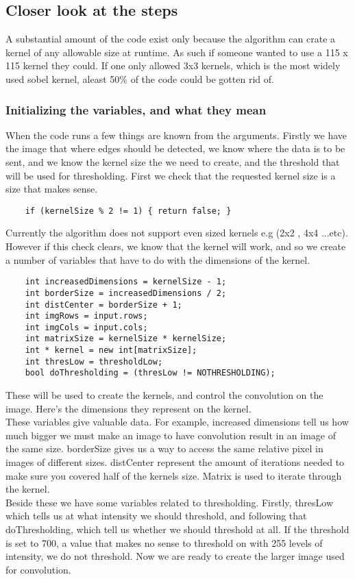 \documentclass{article}
\begin{document}
\subsection{Closer look at the steps}
A substantial amount of the code exist only because the algorithm can crate a kernel of any allowable size at runtime. As such if someone wanted to use a 115 x 115 kernel they could. If one only allowed 3x3 kernels, which is the most widely used sobel kernel, aleast 50\% of the code could be gotten rid of.
\subsubsection{Initializing the variables, and what they mean}
When the code runs a few things are known from the arguments. Firstly we have the image that where edges should be detected, we know where the data is to be sent, and we know the kernel size the we need to create, and the threshold that will be used for thresholding. First we check that the requested kernel size is a size that makes sense.
\begin{lstlisting}
	if (kernelSize % 2 != 1) { return false; }
\end{lstlisting}
Currently the algorithm does not support even sized kernels e.g (2x2 , 4x4 ...etc). However if this check clears, we know that the kernel will work, and so we create a number of variables that have to do with the dimensions of the kernel.
\begin{lstlisting}
	int increasedDimensions = kernelSize - 1;
	int borderSize = increasedDimensions / 2;
	int distCenter = borderSize + 1;
	int imgRows = input.rows;
	int imgCols = input.cols;
	int matrixSize = kernelSize * kernelSize;
	int * kernel = new int[matrixSize];
	int thresLow = thresholdLow;
	bool doThresholding = (thresLow != NOTHRESHOLDING);
\end{lstlisting}
These will be used to create the kernels, and control the convolution on the image. Here's the dimensions they represent on the kernel.\\
These variables give valuable data. For example, increased dimensions tell us how much bigger we must make an image to have convolution result in an image of the same size. borderSize gives us a way to access the same relative pixel in images of different sizes. distCenter represent the amount of iterations needed to make sure you covered half of the kernels size. Matrix is used to iterate through the kernel.\\
Beside these we have some variables related to  thresholding. Firstly, thresLow which tells us at what intensity we should threshold, and following that doThresholding, which tell us whether we should threshold at all. If the threshold is set to 700, a value that makes no sense to threshold on with 255 levels of intensity, we do not threshold. Now we are ready to create the larger image used for convolution.
\end{document}
